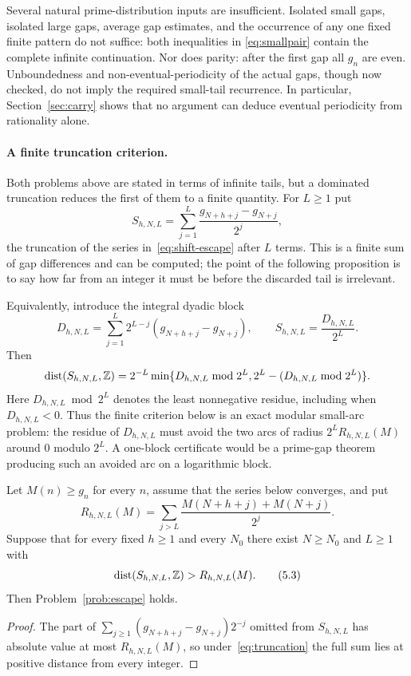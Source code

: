 \documentclass[11pt]{article}
\begin{document}
Several natural prime-distribution inputs are insufficient.  Isolated
small gaps, isolated large gaps, average gap estimates, and the occurrence of
any one fixed finite pattern do not suffice: both inequalities in
\eqref{eq:smallpair} contain the complete infinite continuation.  Nor
does parity: after the first gap all $g_n$ are even.  Unboundedness and
non-eventual-periodicity of the actual gaps, though now checked, do not imply
the required small-tail recurrence.  In particular, Section~\ref{sec:carry}
shows that no argument can deduce eventual periodicity from rationality alone.

\paragraph{A finite truncation criterion.}
Both problems above are stated in terms of infinite tails, but a dominated
truncation reduces the first of them to a finite quantity.  For $L\ge1$ put
\[
 S_{h,N,L}=\sum_{j=1}^{L}
 \frac{g_{N+h+j}-g_{N+j}}{2^j},
\]
the truncation of the series in~\eqref{eq:shift-escape} after $L$ terms.  This
is a finite sum of gap differences and can be computed; the point of the
following proposition is to say how far from an integer it must be before the
discarded tail is irrelevant.

Equivalently, introduce the integral dyadic block
\[
 D_{h,N,L}=\sum_{j=1}^{L}2^{L-j}
   (g_{N+h+j}-g_{N+j}),\qquad S_{h,N,L}=\frac{D_{h,N,L}}{2^L}.
\]
Then
\[
 \operatorname{dist}(S_{h,N,L},\mathbb{Z})
 =2^{-L}\min\{D_{h,N,L}\bmod2^L,
 2^L-(D_{h,N,L}\bmod2^L)\}.
\]
Here $D_{h,N,L}\bmod2^L$ denotes the least nonnegative residue, including
when $D_{h,N,L}<0$.
Thus the finite criterion below is an exact modular small-arc problem: the
residue of $D_{h,N,L}$ must avoid the two arcs of radius
$2^LR_{h,N,L}(M)$ around $0$ modulo $2^L$.  A one-block certificate would be a
prime-gap theorem producing such an avoided arc on a logarithmic block.

\begin{proposition}\label{res:truncation}
Let $M(n)\ge g_n$ for every $n$, assume that the series below converges, and
put
\[
 R_{h,N,L}(M)=
 \sum_{j>L}\frac{M(N+h+j)+M(N+j)}{2^j}.
\]
Suppose that for every fixed $h\ge1$ and every $N_0$ there exist $N\ge N_0$ and
$L\ge1$ with
\[
 \operatorname{dist}(S_{h,N,L},\mathbb{Z})>R_{h,N,L}(M).
\tag{5.3}\label{eq:truncation}
\]
Then Problem~\ref{prob:escape} holds.
\end{proposition}

\begin{proof}
The part of $\sum_{j\ge1}(g_{N+h+j}-g_{N+j})2^{-j}$ omitted from $S_{h,N,L}$
has absolute value at most $R_{h,N,L}(M)$, so under~\eqref{eq:truncation} the
full sum lies at positive distance from every integer.
\end{proof}
\end{document}
